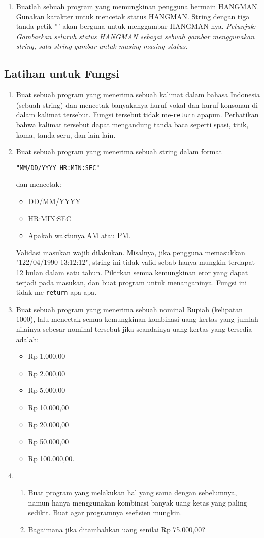 \documentclass[14pt]{extarticle}
\begin{document}
\begin{enumerate}
	\item Buatlah sebuah program yang memungkinan pengguna bermain HANGMAN. Gunakan karakter untuk mencetak status HANGMAN. String dengan tiga tanda petik ''' akan berguna untuk menggambar HANGMAN-nya. \emph{Petunjuk: Gambarkan seluruh status HANGMAN sebagai sebuah gambar menggunakan string, satu string gambar untuk masing-masing status.}
\end{enumerate}

\subsection{Latihan untuk Fungsi}
\begin{enumerate}
	\item Buat sebuah program yang menerima sebuah kalimat dalam bahasa Indonesia (sebuah string) dan mencetak banyakanya huruf vokal dan huruf konsonan di dalam kalimat tersebut. Fungsi tersebut tidak me-\texttt{return} apapun. Perhatikan bahwa kalimat tersebut dapat mengandung tanda baca seperti spasi, titik, koma, tanda seru, dan lain-lain.
	\item  Buat sebuah program yang menerima sebuah string dalam format
	\begin{center} \texttt{"MM/DD/YYYY HR:MIN:SEC"}
	\end{center}
	dan mencetak:
	\begin{itemize}
		\item DD/MM/YYYY
		\item HR:MIN:SEC 
		\item Apakah waktunya AM atau PM.
	\end{itemize}
	Validasi masukan wajib dilakukan. Misalnya, jika pengguna memasukkan "122/04/1990 13:12:12", string ini tidak valid sebab hanya mungkin terdapat 12 bulan dalam satu tahun. Pikirkan semua kemungkinan eror yang dapat terjadi pada masukan, dan buat program untuk menanganinya. Fungsi ini tidak me-\texttt{return} apa-apa.
	\item Buat sebuah program yang menerima sebuah nominal Rupiah (kelipatan 1000), lalu mencetak semua kemungkinan kombinasi uang kertas yang jumlah nilainya sebesar nominal tersebut jika seandainya uang kertas yang tersedia adalah:
	\begin{itemize}
		\item Rp 1.000,00
		\item Rp 2.000,00
		\item Rp 5.000,00
		\item Rp 10.000,00
		\item Rp 20.000,00
		\item Rp 50.000,00
		\item Rp 100.000,00.
	\end{itemize}
	\item 
	\begin{enumerate}
		\item Buat program yang melakukan hal yang sama dengan sebelumnya, namun hanya menggunakan kombinasi banyak uang ketas yang paling sedikit. Buat agar programnya seefisien mungkin.
		\item Bagaimana jika ditambahkan uang senilai Rp 75.000,00?
	\end{enumerate}
\end{enumerate}
\end{document}
